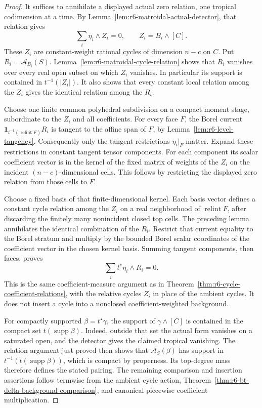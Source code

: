 \documentclass[11pt,a4paper]{article}
\numberwithin{equation}{section}
\theoremstyle{definition}
\theoremstyle{remark}
\begin{document}
\begin{proof}
It suffices to annihilate a displayed actual zero relation, one
tropical codimension at a time.  By
Lemma~\ref{lem:r6-matroidal-actual-detector}, that relation gives
\[
                      \sum_i\eta_i\wedge Z_i=0,
                       \qquad Z_i=B_i\wedge[C].
\]
These $Z_i$ are constant-weight rational cycles of dimension
$n-c$ on $C$.  Put $R_i=\mathcal A_{B_i}(S)$.
Lemma~\ref{lem:r6-matroidal-cycle-relation} shows that $R_i$
vanishes over every real open subset on which $Z_i$ vanishes.
In particular its support is contained in $t^{-1}(|Z_i|)$.
It also shows that every constant local relation among the
$Z_i$ gives the identical relation among the $R_i$.

Choose one finite common polyhedral subdivision on a compact
moment stage, subordinate to the $Z_i$ and all coefficients.
For every face $F$, the Borel current
$\mathbf1_{t^{-1}(\operatorname{relint}F)}R_i$ is tangent to
the affine span of $F$, by Lemma~\ref{lem:r6-level-tangency}.
Consequently only the tangent restrictions $\eta_i|_F$ matter.
Expand these restrictions in constant tangent tensor components.
For each component its scalar coefficient vector is in the
kernel of the fixed matrix of weights of the $Z_i$ on the
incident $(n-c)$-dimensional cells.  This follows by restricting
the displayed zero relation from those cells to $F$.

Choose a fixed basis of that finite-dimensional kernel.  Each
basis vector defines a constant cycle relation among the $Z_i$
on a real neighborhood of $\operatorname{relint}F$, after
discarding the finitely many nonincident closed top cells.
The preceding lemma annihilates the identical combination of
the $R_i$.  Restrict that current equality to the Borel stratum
and multiply by the bounded Borel scalar coordinates of the
coefficient vector in the chosen kernel basis.  Summing tangent
components, then faces, proves
\[
                          \sum_i t^*\eta_i\wedge R_i=0.
\]
This is the same coefficient-measure argument as in
Theorem~\ref{thm:r6-cycle-coefficient-relations}, with the relative
cycles $Z_i$ in place of the ambient cycles.  It does not insert
a cycle into a nonclosed coefficient-weighted background.

For compactly supported $\beta=t^\star\gamma$, the support of
$\gamma\wedge[C]$ is contained in the compact set
$t(\operatorname{supp}\beta)$.  Indeed, outside that set the
actual form vanishes on a saturated open, and the detector gives
the claimed tropical vanishing.  The relation argument just
proved then shows that $\mathcal A_S(\beta)$ has support in
$t^{-1}(t(\operatorname{supp}\beta))$, which is compact by
properness.  Its top-degree mass therefore defines the stated
pairing.  The remaining comparison and insertion assertions
follow termwise from the ambient cycle action,
Theorem~\ref{thm:r6-bt-delta-background-comparison}, and canonical
piecewise coefficient multiplication.
\end{proof}
\end{document}
